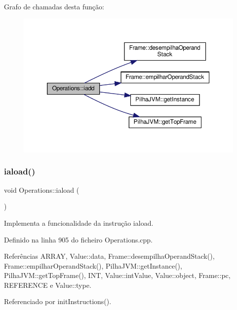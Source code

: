 Grafo de chamadas desta função\+:
\nopagebreak
\begin{figure}[H]
\begin{center}
\leavevmode
\includegraphics[width=350pt]{classOperations_a12d5933f0d0c91c578b76edb1971a2be_cgraph}
\end{center}
\end{figure}
\mbox{\label{classOperations_a77f3b4c161fee7fbd6bb89b170400c0c}} 
\subsubsection{\texorpdfstring{iaload()}{iaload()}}
{\footnotesize\ttfamily void Operations\+::iaload (\begin{DoxyParamCaption}{ }\end{DoxyParamCaption})\hspace{0.3cm}{\ttfamily [private]}}



Implementa a funcionalidade da instrução iaload. 



Definido na linha 905 do ficheiro Operations.\+cpp.



Referências A\+R\+R\+AY, Value\+::data, Frame\+::desempilha\+Operand\+Stack(), Frame\+::empilhar\+Operand\+Stack(), Pilha\+J\+V\+M\+::get\+Instance(), Pilha\+J\+V\+M\+::get\+Top\+Frame(), I\+NT, Value\+::int\+Value, Value\+::object, Frame\+::pc, R\+E\+F\+E\+R\+E\+N\+CE e Value\+::type.



Referenciado por init\+Instructions().

